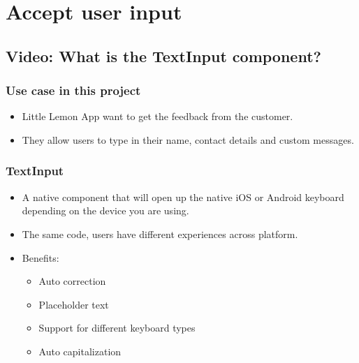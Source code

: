 \chapter{Accept user input}

\section{Video: What is the TextInput component?}
\subsection{Use case in this project}
\begin{itemize}
    \item Little Lemon App want to get the feedback from the customer.
    \item They allow users to type in their name, contact details and custom messages.
\end{itemize}

\subsection{TextInput}
\begin{itemize}
    \item A native component that will open up the native iOS or Android keyboard depending on the device you are using.
    \item The same code, users have different experiences across platform.
    \item Benefits:
    \begin{itemize}
        \item Auto correction
        \item Placeholder text
        \item Support for different keyboard types
        \item Auto capitalization
    \end{itemize}
\end{itemize}

